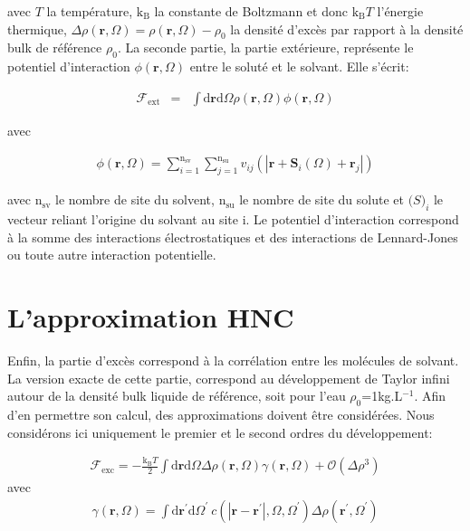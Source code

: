 \noindent avec $T$ la température, $\mathrm{k_B}$ la constante de Boltzmann et donc $\mathrm{k_B}T$ l'énergie thermique, $\Delta\rho\left(\boldsymbol{r},\Omega \right)=\rho\left(\boldsymbol{r},\Omega \right)-\rho_0$ la densité d'excès par rapport à la densité bulk de référence $\rho_0$. La seconde partie, la partie extérieure, représente le potentiel d'interaction $\phi\left(\boldsymbol{r},\Omega \right)$ entre le soluté et le solvant. Elle s'écrit:


\begin{eqnarray}
\mathcal{F}_\mathrm{ext}&=&\int\mathrm{d}\boldsymbol{r}\mathrm{d}\Omega\rho\left(\boldsymbol{r},\Omega \right)\phi\left(\boldsymbol{r},\Omega \right)
\label{eq:fonctionnelle:ext}
\end{eqnarray}

\noindent avec

\begin{eqnarray}
\phi\left(\boldsymbol{r},\Omega \right) = \sum\limits_{i=1}^{\mathrm{n}_\mathrm{sv}}\sum\limits_{j=1}^{\mathrm{n}_\mathrm{su}} v_{ij}(|\boldsymbol{r}+\boldsymbol{S}_i(\Omega)+\boldsymbol{r}_j|)
\end{eqnarray}

\noindent avec $\mathrm{n}_\mathrm{sv}$ le nombre de site du solvent, $\mathrm{n}_\mathrm{su}$ le nombre de site du solute et $\boldsymbol(S)_i$ le vecteur reliant l'origine du solvant au site i. Le potentiel d'interaction correspond à la somme des interactions électrostatiques et des interactions de Lennard-Jones ou toute autre interaction potentielle. 

\section{L'approximation HNC}

Enfin, la partie d'excès correspond à la corrélation entre les molécules de solvant. La version exacte de cette partie, correspond au développement de Taylor infini autour de la densité bulk liquide de référence, soit pour l'eau $\rho_0$=1kg.L$^{-1}$. Afin d'en permettre son calcul, des approximations doivent être considérées. Nous considérons ici uniquement le premier et le second ordres du développement:

\begin{eqnarray}
\mathcal{F}_\mathrm{exc} = -\frac{\mathrm{k_B}T}{2}\int\mathrm{d}\boldsymbol{r}\mathrm{d}\Omega \Delta\rho\left( \boldsymbol{r}, \Omega   \right) \gamma \left(\boldsymbol{r},\Omega\right)  + \mathcal{O}(\Delta\rho^{3})
\label{eq:fonctionnelle:exc}
\end{eqnarray}
\noindent avec
\begin{eqnarray}
\gamma \left(\boldsymbol{r},\Omega\right) = \int\mathrm{d}\boldsymbol{r}^\prime\mathrm{d}\Omega^\prime\  c\left( \left|\boldsymbol{r}-\boldsymbol{r}^\prime\right|,\Omega,\Omega^\prime \right) \Delta\rho\left( \boldsymbol{r}^\prime, \Omega^\prime \right)
\end{eqnarray}

